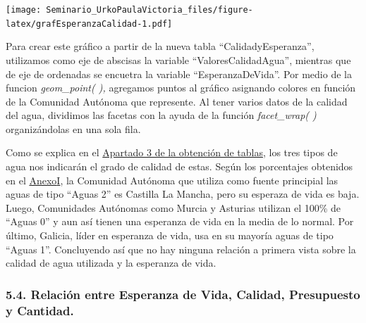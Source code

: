 \documentclass[
]{article}
\begin{document}
\texttt{[image: Seminario\_UrkoPaulaVictoria\_files/figure-latex/grafEsperanzaCalidad-1.pdf]}

Para crear este gráfico a partir de la nueva tabla
``CalidadyEsperanza'', utilizamos como eje de abscisas la variable
``ValoresCalidadAgua'', mientras que de eje de ordenadas se encuetra la
variable ``EsperanzaDeVida''. Por medio de la funcion \emph{geom\_point(
),} agregamos puntos al gráfico asignando colores en función de la
Comunidad Autónoma que represente. Al tener varios datos de la calidad
del agua, dividimos las facetas con la ayuda de la función
\emph{facet\_wrap( )} organizándolas en una sola fila.

Como se explica en el \protect\hyperlink{VariableAgua}{Apartado 3 de la
obtención de tablas}, los tres tipos de agua nos indicarán el grado de
calidad de estas. Según los porcentajes obtenidos en el
\protect\hyperlink{tablaPorcentaje}{Anexo}\protect\hyperlink{anexo}{I},
la Comunidad Autónoma que utiliza como fuente principial las aguas de
tipo ``Aguas 2'' es Castilla La Mancha, pero su esperaza de vida es
baja. Luego, Comunidades Autónomas como Murcia y Asturias utilizan el
100\% de ``Aguas 0'' y aun así tienen una esperanza de vida en la media
de lo normal. Por último, Galicia, líder en esperanza de vida, usa en su
mayoría aguas de tipo ``Aguas 1''. Concluyendo así que no hay ninguna
relación a primera vista sobre la calidad de agua utilizada y la
esperanza de vida.

\hypertarget{relaciuxf3n-entre-esperanza-de-vida-calidad-presupuesto-y-cantidad.}{%
\subsubsection{5.4. Relación entre Esperanza de Vida, Calidad,
Presupuesto y
Cantidad.}\label{relaciuxf3n-entre-esperanza-de-vida-calidad-presupuesto-y-cantidad.}}
\end{document}

